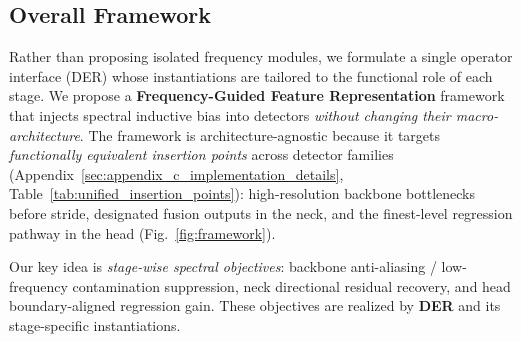 \documentclass{article}
\theoremstyle{plain}
\theoremstyle{definition}
\theoremstyle{remark}
\begin{document}
\begin{algorithm}[ht]
\begin{algorithmic}
        \STATE {}
      \ENDFOR
      \STATE {}
      \STATE {}
        \STATE {}
      \ENDFOR
    \STATE {}
    \STATE {}
    \end{algorithmic}
    \endgroup
    \end{algorithm}
    \vspace{-0.1cm}
\subsection{Overall Framework}

Rather than proposing isolated frequency modules, we formulate a single operator interface (DER) whose instantiations are tailored to the functional role of each stage.
We propose a \textbf{Frequency-Guided Feature Representation} framework that injects spectral inductive bias into detectors \emph{without changing their macro-architecture}. The framework is architecture-agnostic because it targets \emph{functionally equivalent insertion points} across detector families (Appendix~\ref{sec:appendix_c_implementation_details}, Table~\ref{tab:unified_insertion_points}): high-resolution backbone bottlenecks before stride, designated fusion outputs in the neck, and the finest-level regression pathway in the head (Fig.~\ref{fig:framework}).

Our key idea is \emph{stage-wise spectral objectives}: backbone anti-aliasing / low-frequency contamination suppression, neck directional residual recovery, and head boundary-aligned regression gain. These objectives are realized by \textbf{DER} and its stage-specific instantiations.

\end{document}
